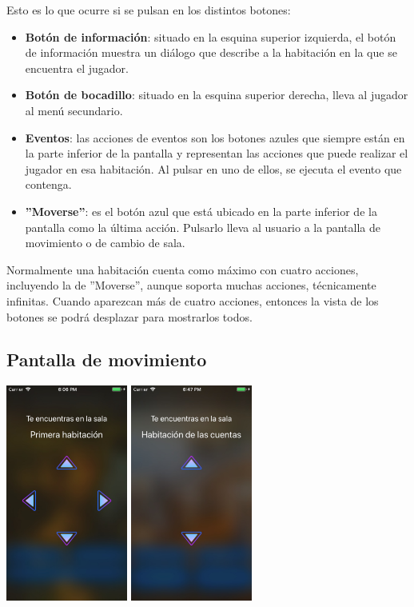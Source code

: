 Esto es lo que ocurre si se pulsan en los distintos botones:
\begin{itemize}
	\item \textbf{Botón de información}: situado en la esquina superior izquierda, el botón de información muestra un diálogo que describe a la habitación en la que se encuentra el jugador.
	\item \textbf{Botón de bocadillo}: situado en la esquina superior derecha, lleva al jugador al menú secundario.
	\item \textbf{Eventos}: las acciones de eventos son los botones azules que siempre están en la parte inferior de la pantalla y representan las acciones que puede realizar el jugador en esa habitación. Al pulsar en uno de ellos, se ejecuta el evento que contenga.
	\item \textbf{''Moverse''}: es el botón azul que está ubicado en la parte inferior de la pantalla como la última acción. Pulsarlo lleva al usuario a la pantalla de movimiento o de cambio de sala.
\end{itemize}

Normalmente una habitación cuenta como máximo con cuatro acciones, incluyendo la de ''Moverse'', aunque soporta muchas acciones, técnicamente infinitas. Cuando aparezcan más de cuatro acciones, entonces la vista de los botones se podrá desplazar para mostrarlos todos.

\subsection{Pantalla de movimiento}
\begin{center}
	\includegraphics[width=0.3\textwidth]{include/snapshots/movementView.jpg}
	\includegraphics[width=0.3\textwidth]{include/snapshots/movementView_2.jpg}
\end{center}

